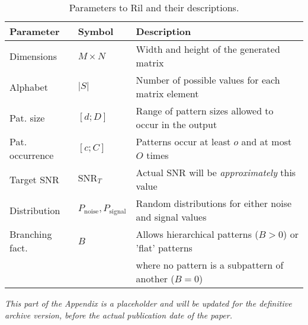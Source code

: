 \documentclass{llncs}
\begin{document}
\begin{table}
\caption{Parameters to Ril and their descriptions.}
\label{table:ril}
\begin{tabular*}{\textwidth}{lll}
\toprule
Parameter & Symbol & Description \\
\midrule
Dimensions & $M\times N$ & Width and height of the generated matrix \\
Alphabet & $|S|$ & Number of possible values for each matrix element \\
Pat. size & $[d;D]$ & Range of pattern sizes allowed to occur in the output \\
Pat. occurrence & $[c;C]$ & Patterns occur at least $o$ and at most $O$ times \\
Target SNR & $\mathrm{SNR}_T$ & Actual SNR will be \emph{approximately} this value \\
Distribution & $P_{\mathrm{noise}}, P_{\mathrm{signal}}$ & Random distributions for either noise and signal values \\
Branching fact. & $B$ & Allows hierarchical patterns ($B>0$) or 'flat' patterns \\
& & where no pattern is a subpattern of another ($B=0$) \\
\bottomrule
\end{tabular*}
\end{table}

\emph{This part of the Appendix is a placeholder and will be updated for the definitive archive version, before the actual publication date of the paper.}
\end{document}
